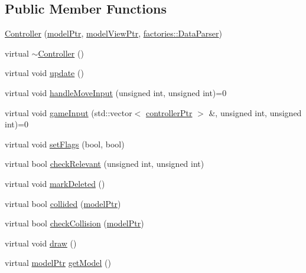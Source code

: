\subsection*{\-Public \-Member \-Functions}
\begin{DoxyCompactItemize}
\item 
\hyperlink{classcontrollers_1_1Controller_a3c74d4726b4e635f261d4dafa5c7807f}{\-Controller} (\hyperlink{ModelView_8h_a78966ddb517fca8d2b29a2bc5c31e74e}{model\-Ptr}, \hyperlink{Controller_8h_a8ca0a41a38eb52be242997413482c0cf}{model\-View\-Ptr}, \hyperlink{classfactories_1_1DataParser}{factories\-::\-Data\-Parser})
\item 
virtual \hyperlink{classcontrollers_1_1Controller_a26a8767e0333b5dd5fa023cb5f624182}{$\sim$\-Controller} ()
\item 
virtual void \hyperlink{classcontrollers_1_1Controller_abbcb9381c698fa83c6867a2f65bebcf8}{update} ()
\item 
virtual void \hyperlink{classcontrollers_1_1Controller_ae4eb0768c65456a1ffe84260c5713013}{handle\-Move\-Input} (unsigned int, unsigned int)=0
\item 
virtual void \hyperlink{classcontrollers_1_1Controller_af489be7993b237aeb54e2d9974db0e04}{game\-Input} (std\-::vector$<$ \hyperlink{namespacecontrollers_ab74cf2ed38c0b0460698b4eb6fe8bec5}{controller\-Ptr} $>$ \&, unsigned int, unsigned int)=0
\item 
virtual void \hyperlink{classcontrollers_1_1Controller_af4b5bfdadbaaf98fe010d9381dca4e7a}{set\-Flags} (bool, bool)
\item 
virtual bool \hyperlink{classcontrollers_1_1Controller_ae261028f5b18e70194e534240fd0ef76}{check\-Relevant} (unsigned int, unsigned int)
\item 
virtual void \hyperlink{classcontrollers_1_1Controller_a6136bf7657dc0c6716392388069085d8}{mark\-Deleted} ()
\item 
virtual bool \hyperlink{classcontrollers_1_1Controller_a4d2a32746f2dd3a7388a731733c329dd}{collided} (\hyperlink{ModelView_8h_a78966ddb517fca8d2b29a2bc5c31e74e}{model\-Ptr})
\item 
virtual bool \hyperlink{classcontrollers_1_1Controller_a4ff3575d684812eaa52371ee67c1d4c8}{check\-Collision} (\hyperlink{ModelView_8h_a78966ddb517fca8d2b29a2bc5c31e74e}{model\-Ptr})
\item 
virtual void \hyperlink{classcontrollers_1_1Controller_a8e28c0be4a528c8cdc4800ac6e377248}{draw} ()
\item 
virtual \hyperlink{ModelView_8h_a78966ddb517fca8d2b29a2bc5c31e74e}{model\-Ptr} \hyperlink{classcontrollers_1_1Controller_a011e62186a007b883fd1ffabd5f8755e}{get\-Model} ()
\end{DoxyCompactItemize}
